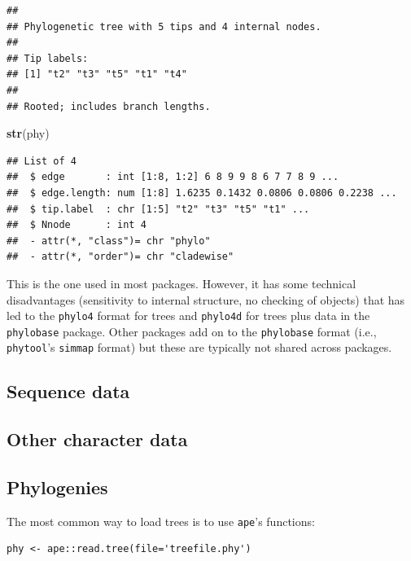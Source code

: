 \documentclass[
]{article}
\newenvironment{Shaded}{\begin{snugshade}}{\end{snugshade}}
\newcommand{\KeywordTok}[1]{\textcolor[rgb]{0.13,0.29,0.53}{\textbf{#1}}}
\newcommand{\NormalTok}[1]{#1}
\begin{document}
\begin{verbatim}
## 
## Phylogenetic tree with 5 tips and 4 internal nodes.
## 
## Tip labels:
## [1] "t2" "t3" "t5" "t1" "t4"
## 
## Rooted; includes branch lengths.
\end{verbatim}

\begin{Shaded}
\begin{Highlighting}[]
\KeywordTok{str}\NormalTok{(phy)}
\end{Highlighting}
\end{Shaded}

\begin{verbatim}
## List of 4
##  $ edge       : int [1:8, 1:2] 6 8 9 9 8 6 7 7 8 9 ...
##  $ edge.length: num [1:8] 1.6235 0.1432 0.0806 0.0806 0.2238 ...
##  $ tip.label  : chr [1:5] "t2" "t3" "t5" "t1" ...
##  $ Nnode      : int 4
##  - attr(*, "class")= chr "phylo"
##  - attr(*, "order")= chr "cladewise"
\end{verbatim}

This is the one used in most packages. However, it has some technical disadvantages (sensitivity to internal structure, no checking of objects) that has led to the \texttt{phylo4} format for trees and \texttt{phylo4d} for trees plus data in the \texttt{phylobase} package. Other packages add on to the \texttt{phylobase} format (i.e., \texttt{phytool}'s \texttt{simmap} format) but these are typically not shared across packages.

\hypertarget{sequence-data}{%
\subsection{Sequence data}\label{sequence-data}}

\hypertarget{other-character-data}{%
\subsection{Other character data}\label{other-character-data}}

\hypertarget{phylogenies}{%
\subsection{Phylogenies}\label{phylogenies}}

The most common way to load trees is to use \texttt{ape}'s functions:

\begin{verbatim}
phy <- ape::read.tree(file='treefile.phy')
\end{verbatim}
\end{document}
